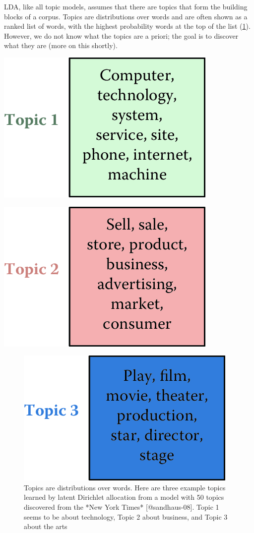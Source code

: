 \documentclass[]{krantz}
\begin{document}
LDA, like all topic models, assumes that there are topics that form the
building blocks of a corpus. Topics are distributions over words and are
often shown as a ranked list of words, with the highest probability
words at the top of the list (\ref{fig:nyt-topics-3}). However, we do
not know what the topics are {a priori}; the goal is to discover what
they are (more on this shortly).

\begin{center}\includegraphics[width=0.7\linewidth]{ChapterText/figures/nyt_topics-1} \end{center}

\begin{center}\includegraphics[width=0.7\linewidth]{ChapterText/figures/nyt_topics-2} \end{center}

\begin{figure}

{\centering \includegraphics[width=0.7\linewidth]{ChapterText/figures/nyt_topics-3} 

}

\caption{Topics are distributions over words. Here are three example topics learned by latent Dirichlet allocation from a model with 50 topics discovered from the *New York Times* [@sandhaus-08]. Topic 1 seems to be about technology, Topic 2 about business, and Topic 3 about the arts}\label{fig:nyt-topics-3}
\end{figure}
\end{document}
